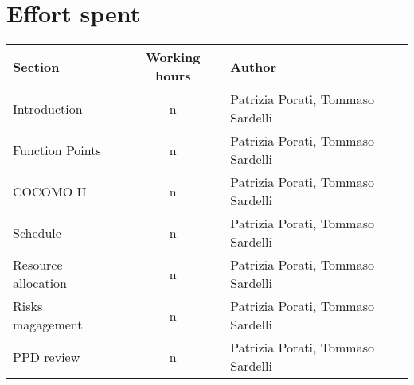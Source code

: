 \pagebreak

\section{Effort spent}

\begin{center}
	\begin{tabular}{ l c l } 
		\hline
		\textbf{Section} 	& \textbf{Working hours} 	& \textbf{Author} \\ 
		\hline
		Introduction 	& n 	& Patrizia Porati, Tommaso Sardelli	\\
		Function Points	 	& n 	& Patrizia Porati, Tommaso Sardelli	\\
		COCOMO II 	& n 	& Patrizia Porati, Tommaso Sardelli \\ 
		Schedule 	& n 	& Patrizia Porati, Tommaso Sardelli	\\
		Resource allocation 	& n 	& Patrizia Porati, Tommaso Sardelli \\
		Risks magagement 	& n 	& Patrizia Porati, Tommaso Sardelli \\
		PPD review 	& n 	& Patrizia Porati, Tommaso Sardelli \\
		\hline
	\end{tabular}
	\vspace{0.4cm}
\end{center}
